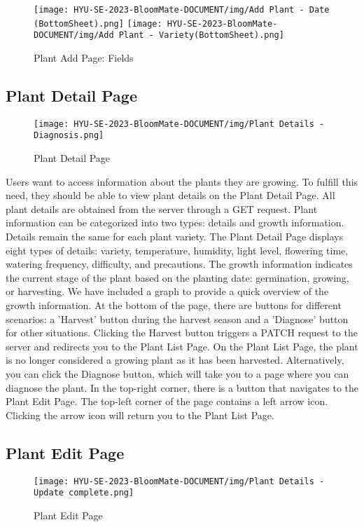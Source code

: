 \documentclass[conference, a4paper]{IEEEtran}
\begin{document}
        \begin{figure}[h]
    \centerline{
        \texttt{[image: HYU-SE-2023-BloomMate-DOCUMENT/img/Add Plant - Date (BottomSheet).png]}
        \texttt{[image: HYU-SE-2023-BloomMate-DOCUMENT/img/Add Plant - Variety(BottomSheet).png]}
    }
    \label{fig}
    \caption{Plant Add Page: Fields}
    \end{figure}
    
    \subsection{Plant Detail Page}
    \begin{figure}[h]
    \centering
    \texttt{[image: HYU-SE-2023-BloomMate-DOCUMENT/img/Plant Details - Diagnosis.png]}
    \label{fig}
    \caption{Plant Detail Page}
    \end{figure}
Users want to access information about the plants they are growing. To fulfill this need, they should be able to view plant details on the Plant Detail Page. All plant details are obtained from the server through a GET request. Plant information can be categorized into two types: details and growth information. Details remain the same for each plant variety. The Plant Detail Page displays eight types of details: variety, temperature, humidity, light level, flowering time, watering frequency, difficulty, and precautions. The growth information indicates the current stage of the plant based on the planting date: germination, growing, or harvesting. We have included a graph to provide a quick overview of the growth information. At the bottom of the page, there are buttons for different scenarios: a 'Harvest' button during the harvest season and a 'Diagnose' button for other situations. Clicking the Harvest button triggers a PATCH request to the server and redirects you to the Plant List Page. On the Plant List Page, the plant is no longer considered a growing plant as it has been harvested. Alternatively, you can click the Diagnose button, which will take you to a page where you can diagnose the plant. In the top-right corner, there is a button that navigates to the Plant Edit Page. The top-left corner of the page contains a left arrow icon. Clicking the arrow icon will return you to the Plant List Page.

    \subsection{Plant Edit Page}
    \begin{figure}[h]
    \centering
    \texttt{[image: HYU-SE-2023-BloomMate-DOCUMENT/img/Plant Details - Update complete.png]}
    \label{fig}
    \caption{Plant Edit Page}
    \end{figure}
\end{document}
